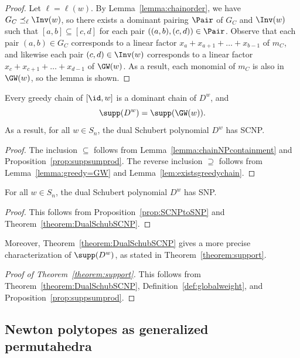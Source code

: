 \begin{proof}
    Let $\ell = \ell(w)$. By Lemma~\ref{lemma:chainorder}, we have $G_C\preceq_{\ell} \Inv(w)$, so there exists a dominant pairing $\Pair$ of $G_C$ and $\Inv(w)$ such that $[a,b]\subseteq [c,d]$ for each pair $((a,b),(c,d))\in \Pair$. Observe that each pair $(a,b)\in G_C$ corresponds to a linear factor $x_a+x_{a+1}+\dots+x_{b-1}$
    of $m_C$, and likewise each pair $(c,d)\in \Inv(w)$ corresponds to a linear factor $x_c+x_{c+1}+\dots+x_{d-1}$
    of $\GW(w)$. As a result, each monomial of $m_C$ is also in $\GW(w)$, so the lemma is shown.
\end{proof}

\begin{theorem}\label{theorem:DualSchubSCNP}
    Every greedy chain of $[\id, w]$ is a dominant chain of $D^w$, and 
    \[\supp (D^w)= \supp(\GW(w)).\]
    As a result, for all $w\in S_n$, the dual Schubert polynomial $D^w$ has SCNP.
\end{theorem}

\begin{proof}
The inclusion $\subseteq$ follows from Lemma~\ref{lemma:chainNPcontainment} and Proposition~\ref{prop:suppsumprod}. The reverse inclusion $\supseteq$ follows from Lemma~\ref{lemma:greedy=GW} and Lemma~\ref{lem:existsgreedychain}.

\end{proof}

\begin{coro}\label{cor:DualSchubSNP}
    For all $w\in S_n$, the dual Schubert polynomial $D^w$ has SNP.
\end{coro}

\begin{proof}
    This follows from Proposition~\ref{prop:SCNPtoSNP} and Theorem~\ref{theorem:DualSchubSCNP}. 
\end{proof}

Moreover, Theorem~\ref{theorem:DualSchubSCNP} gives a more precise characterization of $\supp(D^w)$, as stated in Theorem~\ref{theorem:support}.

\begin{proof}[Proof of Theorem~\ref{theorem:support}]
    This follows from Theorem~\ref{theorem:DualSchubSCNP}, Definition~\ref{def:globalweight}, and Proposition~\ref{prop:suppsumprod}.
\end{proof}

\subsection{Newton polytopes as generalized permutahedra}\label{section:newtongeneralizedpermutahedra}


